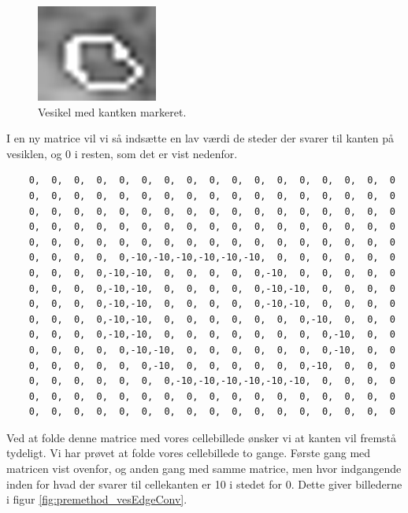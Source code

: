 \begin{figure}[H]
	\centering
	\includegraphics[scale=0.8]{files/premethod/img/vesikel_edge.png}
	\caption{Vesikel med kantken markeret.\label{fig:premethod_vesedge}}
\end{figure}

I en ny matrice vil vi så indsætte en lav værdi de steder der svarer til kanten på vesiklen, og 0 i resten, som det er vist nedenfor.

\begin{verbatim}
	0,  0,  0,  0,  0,  0,  0,  0,  0,  0,  0,  0,  0,  0,  0,  0,  0 
	0,  0,  0,  0,  0,  0,  0,  0,  0,  0,  0,  0,  0,  0,  0,  0,  0 
	0,  0,  0,  0,  0,  0,  0,  0,  0,  0,  0,  0,  0,  0,  0,  0,  0 
	0,  0,  0,  0,  0,  0,  0,  0,  0,  0,  0,  0,  0,  0,  0,  0,  0 
	0,  0,  0,  0,  0,  0,  0,  0,  0,  0,  0,  0,  0,  0,  0,  0,  0 
	0,  0,  0,  0,  0,-10,-10,-10,-10,-10,-10,  0,  0,  0,  0,  0,  0 
	0,  0,  0,  0,-10,-10,  0,  0,  0,  0,  0,-10,  0,  0,  0,  0,  0 
	0,  0,  0,  0,-10,-10,  0,  0,  0,  0,  0,-10,-10,  0,  0,  0,  0
	0,  0,  0,  0,-10,-10,  0,  0,  0,  0,  0,-10,-10,  0,  0,  0,  0 
	0,  0,  0,  0,-10,-10,  0,  0,  0,  0,  0,  0,  0,-10,  0,  0,  0 
	0,  0,  0,  0,-10,-10,  0,  0,  0,  0,  0,  0,  0,  0,-10,  0,  0 
	0,  0,  0,  0,  0,-10,-10,  0,  0,  0,  0,  0,  0,  0,-10,  0,  0 
	0,  0,  0,  0,  0,  0,-10,  0,  0,  0,  0,  0,  0,-10,  0,  0,  0 
	0,  0,  0,  0,  0,  0,  0,-10,-10,-10,-10,-10,-10,  0,  0,  0,  0 
	0,  0,  0,  0,  0,  0,  0,  0,  0,  0,  0,  0,  0,  0,  0,  0,  0 
	0,  0,  0,  0,  0,  0,  0,  0,  0,  0,  0,  0,  0,  0,  0,  0,  0
\end{verbatim}

Ved at folde denne matrice med vores cellebillede ønsker vi at kanten vil fremstå tydeligt. Vi har prøvet at folde vores cellebillede to gange. Første gang med matricen vist ovenfor, og anden gang med samme matrice, men hvor indgangende inden for hvad der svarer til cellekanten er 10 i stedet for 0. Dette giver billederne i figur \ref{fig:premethod_vesEdgeConv}.

